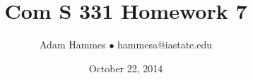 \documentclass[11pt]{article}
\begin{document}
\title{Com S 331 Homework 7}
\author{Adam Hammes $\bullet$ hammesa@iastate.edu}
\date{October 22, 2014}
\maketitle
\end{document}
